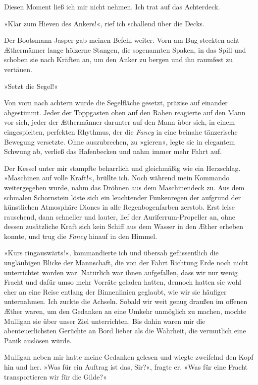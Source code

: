 Diesen Moment ließ ich mir nicht nehmen. Ich trat auf das
Achterdeck.

»Klar zum Hieven des Ankers!«, rief ich schallend über die Decks.

Der Bootsmann Jasper gab meinen Befehl weiter. Vorn am Bug steckten
acht Æthermänner lange hölzerne Stangen, die sogenannten Spaken, in
das Spill und schoben sie nach Kräften an, um den Anker zu bergen
und ihn raumfest zu vertäuen.

»Setzt die Segel!«

Von vorn nach achtern wurde die Segelfläche gesetzt, präzise auf
einander abgestimmt. Jeder der Toppgasten oben auf den Rahen
reagierte auf den Mann vor sich, jeder der Æthermänner darunter auf
den Mann über sich, in einem eingespielten, perfekten Rhythmus, der
die \emph{Fancy} in eine beinahe tänzerische Bewegung versetzte.
Ohne auszubrechen, zu »gieren«, legte sie in elegantem Schwung ab,
verließ das Hafenbecken und nahm immer mehr Fahrt auf.

Der Kessel unter mir stampfte beharrlich und gleichmäßig wie ein
Herzschlag. »Maschinen auf volle Kraft!«, brüllte ich. Noch während
mein Kommando weitergegeben wurde, nahm das Dröhnen aus dem
Maschinendeck zu. Aus dem schmalen Schornstein löste sich ein
leuchtender Funkenregen der aufgrund der künstlichen Atmosphäre
Diones in alle Regenbogenfarben zerstob. Erst leise rauschend, dann
schneller und lauter, lief der Auriferrum-Propeller an, ohne dessen
zusätzliche Kraft sich kein Schiff aus dem Wasser in den Æther
erheben konnte, und trug die \emph{Fancy} hinauf in den Himmel.

\bigpar

»Kurs ringauswärts!«, kommandierte ich und übersah geflissentlich
die ungläubigen Blicke der Mannschaft, die von der Fahrt Richtung
Erde noch nicht unterrichtet worden war. Natürlich war ihnen
aufgefallen, dass wir nur wenig Fracht und dafür umso mehr Vorräte
geladen hatten, dennoch hatten sie wohl eher an eine Reise entlang
der Binnenlinien geglaubt, wie wir sie häufiger unternahmen. Ich
zuckte die Achseln. Sobald wir weit genug draußen im offenen Æther
waren, um den Gedanken an eine Umkehr unmöglich zu machen, mochte
Mulligan sie über unser Ziel unterrichten. Bis dahin waren mir die
abenteuerlichsten Gerüchte an Bord lieber als die Wahrheit, die
vermutlich eine Panik auslösen würde.

Mulligan neben mir hatte meine Gedanken gelesen und wiegte
zweifelnd den Kopf hin und her. »Was für ein Auftrag ist das,
Sir?«, fragte er. »Was für eine Fracht transportieren wir für die
Gilde?«

